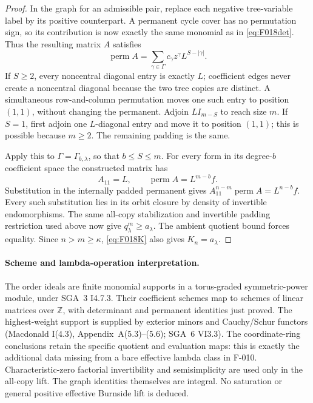 \begin{proof}
In the graph for an admissible pair, replace each negative
tree-variable label by its positive counterpart. A permanent
cycle cover has no permutation sign, so its contribution is
now exactly the same monomial as in \eqref{eq:F018det}.
Thus the resulting matrix \(A\) satisfies
\[
                 \operatorname{perm}A
                    =\sum_{\gamma\in\Gamma}
                              c_\gamma z^\gamma L^{S-|\gamma|}.
\]
If \(S\geq2\), every noncentral diagonal entry is exactly
\(L\); coefficient edges never create a noncentral diagonal
because the two tree copies are distinct. A simultaneous
row-and-column permutation moves one such entry to position
\((1,1)\), without changing the permanent. Adjoin
\(L I_{m-S}\) to reach size \(m\).
If \(S=1\), first adjoin one \(L\)-diagonal entry and
move it to position \((1,1)\); this is possible because
\(m\geq2\). The remaining padding is the same.

Apply this to \(\Gamma=\Gamma_{b,\lambda}\), so that
\(b\leq S\leq m\). For every form in its degree-\(b\)
coefficient space the constructed matrix has
\[
                 A_{11}=L,\qquad
                 \operatorname{perm}A=L^{m-b}f.
\]
Substitution in the internally padded permanent gives
\(A_{11}^{n-m}\operatorname{perm}A=L^{n-b}f\).
Every such substitution lies in its orbit closure by density
of invertible endomorphisms. The same all-copy stabilization
and invertible padding restriction used above now give
\(q^m_\lambda\geq a_\lambda\). The ambient quotient
bound forces equality. Since \(n>m\geq\kappa\),
\eqref{eq:F018K} also gives \(K_n=a_\lambda\).
\end{proof}

\paragraph{Scheme and lambda-operation interpretation.}
The order ideals are finite monomial supports in a torus-graded
symmetric-power module, under SGA~3 I4.7.3. Their coefficient
schemes map to schemes of linear matrices over \(\mathbb Z\),
with determinant and permanent identities just proved.
The highest-weight support is supplied by exterior minors
and Cauchy/Schur functors (Macdonald I(4.3), Appendix~A(5.3)--(5.6);
SGA~6 VI3.3). The coordinate-ring conclusions retain the
specific quotient and evaluation maps: this is exactly the
additional data missing from a bare effective lambda class
in F-010. Characteristic-zero factorial invertibility and
semisimplicity are used only in the all-copy lift. The graph
identities themselves are integral. No saturation or general
positive effective Burnside lift is deduced.
